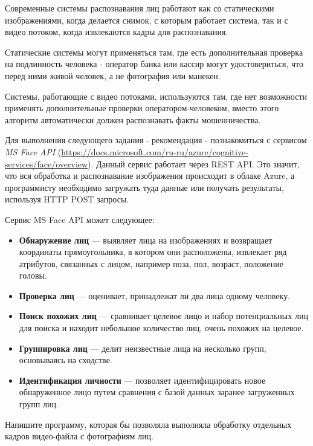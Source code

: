 
Современные системы распознавания лиц работают как со статическими изображениями, когда делается снимок, с которым работает система, так и с видео потоком, когда извлекаются кадры для распознавания.

Статические системы могут применяться там, где есть дополнительная проверка на подлинность человека - оператор банка или кассир могут удостовериться, что перед ними живой человек, а не фотография или манекен.

Системы, работающие с видео потоками, используются там, где нет возможности применять дополнительные проверки оператором-человеком, вместо этого алгоритм автоматически должен распознавать факты мошенничества.

Для выполнения следующего задания - рекомендация - познакомиться с сервисом \textit{MS Face API} (\url{https://docs.microsoft.com/ru-ru/azure/cognitive-services/fa}\linebreak \url{ce/overview}). Данный сервис работает через REST API. Это значит, что вся обработка и распознавание изображения происходит в облаке Azure, а программисту необходимо загружать туда данные или получать результаты, используя HTTP POST запросы.

Сервис MS Face API может следующее:
\begin{itemize}
  \item \textbf{Обнаружение лиц} --- выявляет лица на изображениях и возвращает координаты прямоугольника, в котором они расположены, извлекает ряд атрибутов, связанных с лицом, например поза, пол, возраст, положение головы. 
  \item \textbf{Проверка лиц} --- оценивает, принадлежат ли два лица одному человеку.
  \item \textbf{Поиск похожих лиц} --- сравнивает целевое лицо и набор потенциальных лиц для поиска и находит небольшое количество лиц, очень похожих на целевое.
  \item \textbf{Группировка лиц} --- делит неизвестные лица на несколько групп, основываясь на сходстве.
  \item \textbf{Идентификация личности} --- позволяет идентифицировать новое обнаруженное лицо путем сравнения с базой данных заранее загруженных групп лиц.
\end{itemize}

Напишите программу, которая бы позволяла выполняла обработку отдельных кадров видео-файла с фотографиям лиц.

